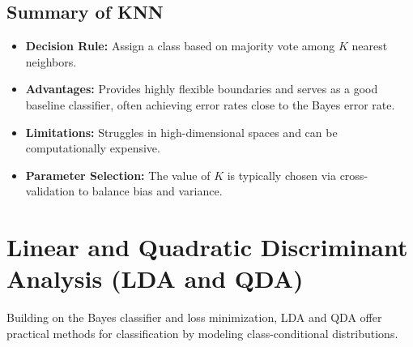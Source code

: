 \documentclass[12pt]{article}
\begin{document}
\subsection{Summary of KNN}

\begin{itemize}
    \item \textbf{Decision Rule:} Assign a class based on majority vote among $K$ nearest neighbors.
    \item \textbf{Advantages:} Provides highly flexible boundaries and serves as a good baseline classifier, often achieving error rates close to the Bayes error rate.
    \item \textbf{Limitations:} Struggles in high-dimensional spaces and can be computationally expensive.
    \item \textbf{Parameter Selection:} The value of $K$ is typically chosen via cross-validation to balance bias and variance.
\end{itemize}

\section{Linear and Quadratic Discriminant Analysis (LDA and QDA)}

Building on the Bayes classifier and loss minimization, LDA and QDA offer practical methods for classification by modeling class-conditional distributions.
\end{document}
